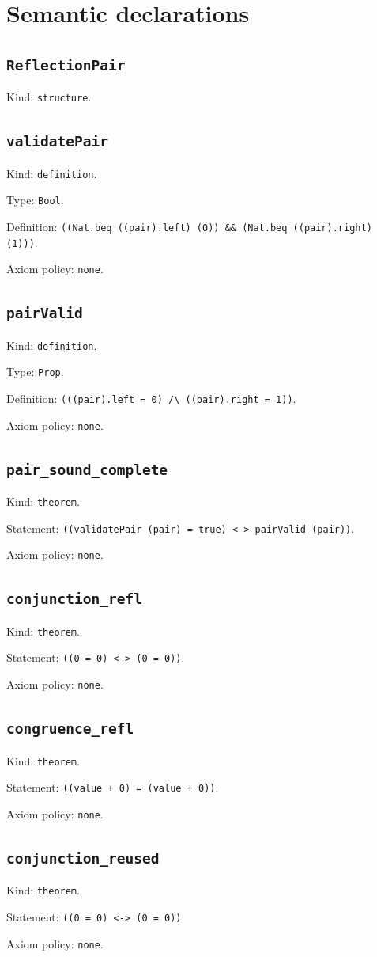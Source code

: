 \documentclass[11pt]{article}
\begin{document}
\section*{Semantic declarations}
\subsection*{\texttt{ReflectionPair}}
\noindent Kind: \texttt{structure}.\par
\subsection*{\texttt{validatePair}}
\noindent Kind: \texttt{definition}.\par
\noindent Type: \texttt{Bool}.\par
\noindent Definition: \texttt{((Nat.beq ((pair).left) (0)) \&\& (Nat.beq ((pair).right) (1)))}.\par
\noindent Axiom policy: \texttt{none}.\par
\subsection*{\texttt{pairValid}}
\noindent Kind: \texttt{definition}.\par
\noindent Type: \texttt{Prop}.\par
\noindent Definition: \texttt{(((pair).left = 0) /\textbackslash{} ((pair).right = 1))}.\par
\noindent Axiom policy: \texttt{none}.\par
\subsection*{\texttt{pair\_sound\_complete}}
\noindent Kind: \texttt{theorem}.\par
\noindent Statement: \texttt{((validatePair (pair) = true) <-> pairValid (pair))}.\par
\noindent Axiom policy: \texttt{none}.\par
\subsection*{\texttt{conjunction\_refl}}
\noindent Kind: \texttt{theorem}.\par
\noindent Statement: \texttt{((0 = 0) <-> (0 = 0))}.\par
\noindent Axiom policy: \texttt{none}.\par
\subsection*{\texttt{congruence\_refl}}
\noindent Kind: \texttt{theorem}.\par
\noindent Statement: \texttt{((value + 0) = (value + 0))}.\par
\noindent Axiom policy: \texttt{none}.\par
\subsection*{\texttt{conjunction\_reused}}
\noindent Kind: \texttt{theorem}.\par
\noindent Statement: \texttt{((0 = 0) <-> (0 = 0))}.\par
\noindent Axiom policy: \texttt{none}.\par
\end{document}
